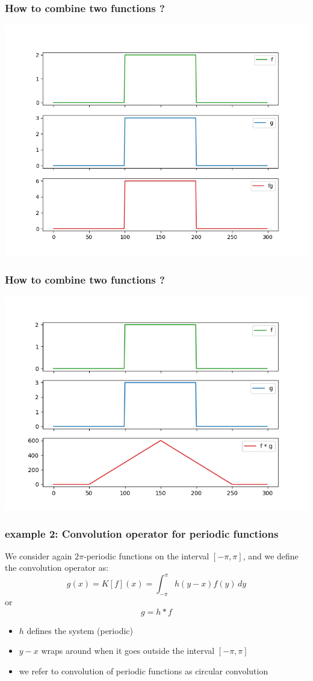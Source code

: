 \documentclass{beamer}
\begin{document}
\begin{frame}
	\frametitle{How to combine two functions ?}
\center
	\includegraphics[scale=0.5]{media/multiplied.png}

\end{frame}
\begin{frame}
	\frametitle{How to combine two functions ?}
\center
	\includegraphics[scale=0.5]{media/convolved.png}

\end{frame}
\begin{frame}
	\frametitle{example 2: Convolution operator for periodic functions}
	We consider again $2\pi$-periodic functions on the interval $[-\pi, \pi]$, and we define the convolution operator as: 
	$$ g(x)  =  K[f](x)  = \int_{-\pi}^{\pi} h(y - x )f(y) \, dy $$  or $$ g  =  h * f$$
		 \pause
	\begin{itemize}
		\item $h$ defines the system (periodic) 
		\item $y-x$ wraps around when it goes outside the interval $[-\pi, \pi]$
		\item we refer to convolution of periodic functions as circular convolution
	\end{itemize}
\end{frame}
\end{document}
